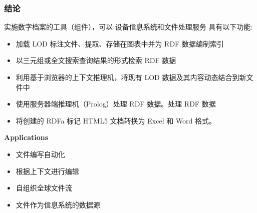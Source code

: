 \documentclass[10pt]{beamer}
\begin{document}
\begin{frame}
  \frametitle{结论}
实施数字档案的工具（组件），可以
设备信息系统和文件处理服务
具有以下功能:
\begin{itemize}
\item 加载 LOD 标注文件、提取、存储在图表中并为 RDF 数据编制索引
\item 以三元组或全文搜索查询结果的形式检索 RDF 数据
\item 利用基于浏览器的上下文推理机，将现有 LOD 数据及其内容动态结合到新文件中
\item 使用服务器端推理机（Prolog）处理 RDF 数据。处理 RDF 数据
\item 将创建的 RDFa 标记 HTML5 文档转换为 Excel 和 Word 格式。
\end{itemize}

  \textbf{Applications}
  \begin{itemize}
  \item 文件编写自动化
  \item 根据上下文进行编辑
  \item 自组织全球文件流
  \item 文件作为信息系统的数据源
  \end{itemize}

\end{frame}

\end{document}
